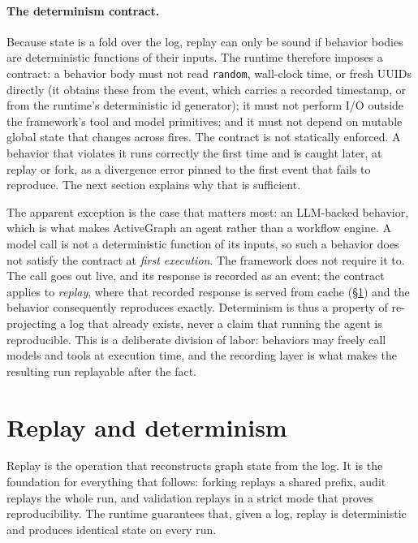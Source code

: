 \documentclass[11pt]{article}
\begin{document}
\paragraph{The determinism contract.}
Because state is a fold over the log, replay can only be sound if behavior bodies
are deterministic functions of their inputs. The runtime therefore imposes a
contract: a behavior body must not read \texttt{random}, wall-clock time, or fresh
UUIDs directly (it obtains these from the event, which carries a recorded
timestamp, or from the runtime's deterministic id generator); it must not perform
I/O outside the framework's tool and model primitives; and it must not depend on
mutable global state that changes across fires. The contract is not statically
enforced. A behavior that violates it runs correctly the first time and is caught
later, at replay or fork, as a divergence error pinned to the first event that
fails to reproduce. The next section explains why that is sufficient.

The apparent exception is the case that matters most: an LLM-backed behavior,
which is what makes ActiveGraph an agent rather than a workflow engine. A model
call is not a deterministic function of its inputs, so such a behavior does not
satisfy the contract at \emph{first execution}. The framework does not require it
to. The call goes out live, and its response is recorded as an event; the contract
applies to \emph{replay}, where that recorded response is served from cache (\S\ref{sec:replay})
and the behavior consequently reproduces exactly. Determinism is thus a property
of re-projecting a log that already exists, never a claim that running the agent
is reproducible. This is a deliberate division of labor: behaviors may freely call
models and tools at execution time, and the recording layer is what makes the
resulting run replayable after the fact.

\section{Replay and determinism}
\label{sec:replay}

Replay is the operation that reconstructs graph state from the log. It is the
foundation for everything that follows: forking replays a shared prefix, audit
replays the whole run, and validation replays in a strict mode that proves
reproducibility. The runtime guarantees that, given a log, replay is deterministic
and produces identical state on every run.
\end{document}
